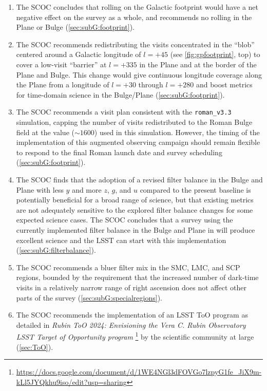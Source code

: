 \begin{enumerate}
\item The SCOC concludes that rolling on the Galactic footprint would have a net negative effect on the survey as a whole, and recommends no rolling in the Plane or Bulge (\autoref{sec:subG:footprint}).


\item The SCOC recommends redistributing the visits concentrated in the ``blob'' centered around a Galactic longitude of $l=+45$ (see \autoref{fig:gpfootprint}, top) to cover a low-visit ``barrier'' at $l=+335$ in the Plane and at the border of the Plane and Bulge. This change would give continuous longitude coverage along the Plane from a longitude of $l=+30$  through $l=+280$ and boost metrics for time-domain science in the Bulge/Plane (\autoref{sec:subG:footprint}).

\item The SCOC recommends a visit plan consistent with the \texttt{roman\_v3.3} simulation, capping the number of visits redistributed to the Roman Bulge field at the value ($\sim 1600$) used in this simulation. However, the timing of the implementation of this augmented observing campaign should remain flexible to respond to the final Roman launch date and survey scheduling (\autoref{sec:subG:footprint}).

\item The SCOC finds that the adoption of a revised filter balance in the Bulge and Plane with less $y$ and more $z$, $g$, and $u$ compared to the present baseline is potentially beneficial for a broad range of science, but that existing metrics are not adequately sensitive to the explored filter balance changes for some expected science cases. The SCOC concludes that a survey using the currently implemented filter balance in the Bulge and Plane in  will produce excellent science and the LSST can start with this implementation (\autoref{sec:subG:filterbalance}).

\item The SCOC recommends a bluer filter mix in the SMC, LMC, and SCP regions, bounded by the requirement that the increased number of dark-time visits in a relatively narrow range of right ascension does not affect other parts of the survey (\autoref{sec:subG:specialregions}).

\item The SCOC recommends the implementation of an LSST ToO program as detailed in \emph{Rubin ToO 2024: 
Envisioning the Vera C. Rubin Observatory LSST Target of Opportunity program
}\footnote{\url{https://docs.google.com/document/d/1WE4NGl3dFOVGo7lzpyG1fe_JiX9m-kLl5JYQkhu9iso/edit?usp=sharing}} by the scientific community at large (\autoref{sec:ToO}).


\end{enumerate}

